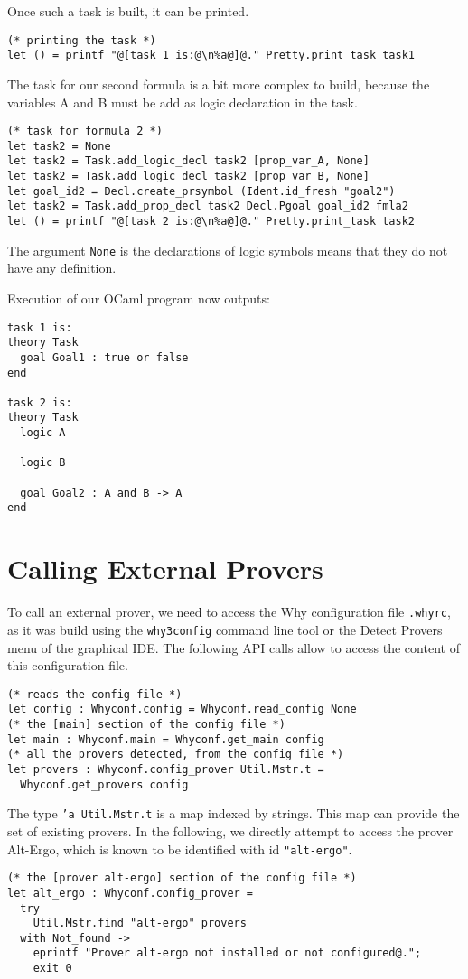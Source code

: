 Once such a task is built, it can be printed.
\begin{verbatim}
(* printing the task *)
let () = printf "@[task 1 is:@\n%a@]@." Pretty.print_task task1
\end{verbatim}

The task for our second formula is a bit more complex to build, because the variables A and B must be add as logic declaration in the task.
\begin{verbatim}
(* task for formula 2 *)
let task2 = None
let task2 = Task.add_logic_decl task2 [prop_var_A, None] 
let task2 = Task.add_logic_decl task2 [prop_var_B, None] 
let goal_id2 = Decl.create_prsymbol (Ident.id_fresh "goal2") 
let task2 = Task.add_prop_decl task2 Decl.Pgoal goal_id2 fmla2
let () = printf "@[task 2 is:@\n%a@]@." Pretty.print_task task2
\end{verbatim}
The argument \texttt{None} is the declarations of logic symbols means
that they do not have any definition.

Execution of our OCaml program now outputs:
\begin{verbatim}
task 1 is:
theory Task
  goal Goal1 : true or false
end

task 2 is:
theory Task
  logic A
  
  logic B
  
  goal Goal2 : A and B -> A
end
\end{verbatim}

\section{Calling External Provers}

To call an external prover, we need to access the Why configuration
file \texttt{.whyrc}, as it was build using the \texttt{why3config}
command line tool or the \textsf{Detect Provers} menu of the graphical
IDE. The following API calls allow to access the content of this
configuration file.
\begin{verbatim}
(* reads the config file *)
let config : Whyconf.config = Whyconf.read_config None
(* the [main] section of the config file *)
let main : Whyconf.main = Whyconf.get_main config
(* all the provers detected, from the config file *)
let provers : Whyconf.config_prover Util.Mstr.t = 
  Whyconf.get_provers config
\end{verbatim}
The type \texttt{'a Util.Mstr.t} is a map indexed by strings. This map
can provide the set of existing provers. In the following, we directly
attempt to access the prover Alt-Ergo, which is known to be identified
with id \texttt{"alt-ergo"}.
\begin{verbatim}
(* the [prover alt-ergo] section of the config file *)
let alt_ergo : Whyconf.config_prover = 
  try
    Util.Mstr.find "alt-ergo" provers 
  with Not_found ->
    eprintf "Prover alt-ergo not installed or not configured@.";
    exit 0
\end{verbatim}

